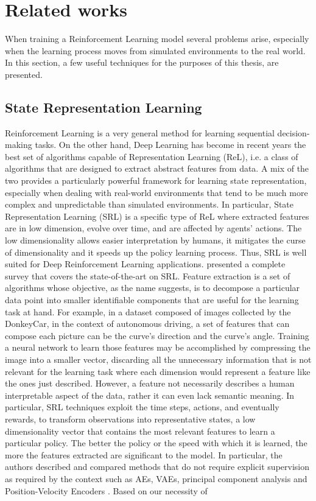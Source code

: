 \chapter{Related works}

When training a Reinforcement Learning model several problems arise, especially when the learning process moves from simulated environments to the real world. In this section, a few useful techniques for the purposes of this thesis, are presented.

\section{State Representation Learning} \label{sec:srl}
Reinforcement Learning is a very general method for learning sequential decision-making tasks. On the other hand, Deep Learning has become in recent years the best set of algorithms capable of Representation Learning (ReL), i.e. a class of algorithms that are designed to extract abstract features from data. A mix of the two provides a particularly powerful framework for learning state representation, especially when dealing with real-world environments that tend to be much more complex and unpredictable than simulated environments. In particular, State Representation Learning (SRL) is a specific type of ReL where extracted features are in low dimension, evolve over time, and are affected by agents' actions. The low dimensionality allows easier interpretation by humans, it mitigates the curse of dimensionality and it speeds up the policy learning process. Thus, SRL is well suited for Deep Reinforcement Learning applications. \citet{DBLP:journals/corr/abs-1802-04181} presented a complete survey that covers the state-of-the-art on SRL. Feature extraction is a set of algorithms whose objective, as the name suggests, is to decompose a particular data point into smaller identifiable components that are useful for the learning task at hand. For example, in a dataset composed of images collected by the DonkeyCar, in the context of autonomous driving, a set of features that can compose each picture can be the curve's direction and the curve's angle. Training a neural network to learn those features may be accomplished by compressing the image into a smaller vector, discarding all the unnecessary information that is not relevant for the learning task where each dimension would represent a feature like the ones just described. However, a feature not necessarily describes a human interpretable aspect of the data, rather it can even lack semantic meaning. In particular, SRL techniques exploit the time steps, actions, and eventually rewards, to transform observations into representative states, a low dimensionality vector that contains the most relevant features to learn a particular policy. The better the policy or the speed with which it is learned, the more the features extracted are significant to the model. In particular, the authors described and compared methods that do not require explicit supervision as required by the context such as AEs, VAEs, principal component analysis \citep{https://doi.org/10.48550/arxiv.1505.00322} and Position-Velocity Encoders \citep{DBLP:journals/corr/JonschkowskiHSR17}. Based on our necessity of 
